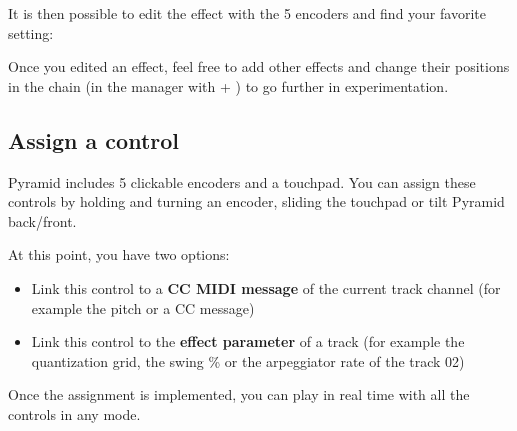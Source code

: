 
It is then possible to edit the effect with the 5 encoders \encodersicon{} and find your favorite setting:



Once you edited an effect, feel free to add other effects and change their positions in the chain (in the manager with  + \encodericon{}) to go further in experimentation.




\subsection{Assign a control}

Pyramid includes 5 clickable encoders and a touchpad. You can assign these controls by holding  and turning an encoder, sliding the touchpad or tilt Pyramid back/front.

At this point, you have two options:

\begin{itemize}
\item Link this control to a \textbf{CC MIDI message} of the current track channel (for example the pitch or a CC message)
\item Link this control to the \textbf{effect parameter} of a track (for example the quantization grid, the swing \% or the arpeggiator rate of the track 02)
\end{itemize}



Once the assignment is implemented, you can play in real time with all the controls in any mode.

